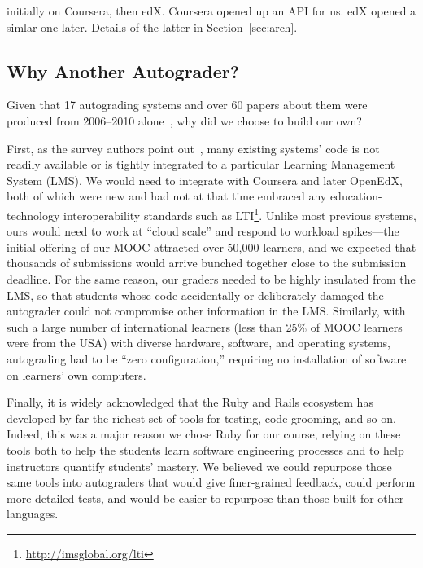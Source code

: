initially on Coursera, then edX.  Coursera opened up an API for us. edX
opened a simlar one later. Details of the latter in Section~\ref{sec:arch}.

\subsection{Why Another Autograder?}

Given that 17 autograding systems and over 60 papers about them were
produced from 2006--2010 alone~\cite{ihantola-2010-autograding-survey},
why did we choose to build our own?

First, as the survey authors point
out~\cite{ihantola-2010-autograding-survey}, many existing systems' code
is not readily available or is tightly integrated to a particular Learning
Management System (LMS).  We would need to integrate with Coursera and
later OpenEdX, both of which were new and had not at that time embraced
any education-technology interoperability standards such as
LTI\footnote{\url{http://imsglobal.org/lti}}.  Unlike most previous
systems, ours would need to work at ``cloud scale'' and respond to
workload spikes---the initial
offering of our MOOC attracted over 50,000 learners, and we expected
that thousands of submissions would arrive bunched together close to the
submission deadline.  For the same reason, our graders needed to be
highly insulated from the LMS, so that students whose code accidentally
or deliberately damaged the autograder could not compromise other
information in the LMS.
Similarly, with such a large number of international learners (less than
25\% of MOOC learners were from the USA) with diverse hardware,
software, and operating systems, autograding had to be ``zero
configuration,'' requiring no installation of software on learners' own computers.

Finally, it is widely acknowledged that the Ruby and Rails
ecosystem has developed by far the richest set of tools for testing,
code grooming, and so on.
Indeed, this was a major reason we chose Ruby for our course,
relying on these tools both to help the students learn software
engineering processes and to help instructors quantify students' mastery.
We believed we could repurpose those same tools into autograders that
would give finer-grained feedback, could perform more detailed tests,
and would be easier to repurpose than those built for other languages.
